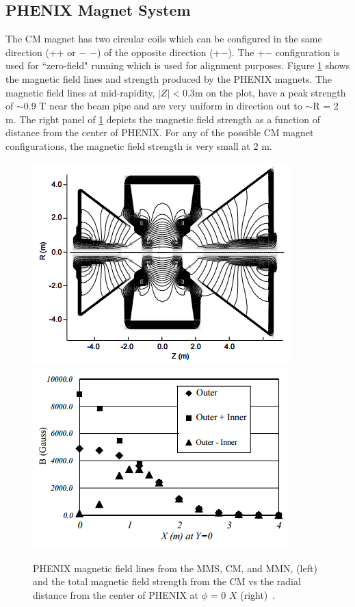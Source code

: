 \subsection{PHENIX Magnet System}
 The CM magnet has two circular coils which can be configured in the same direction (++ or $-$ $-$) of the opposite direction (+$-$). The +$-$ configuration is used for ``zero-field" running which is used for alignment purposes. Figure \ref{fig:magnet_figures} shows the magnetic field lines and strength produced by the PHENIX magnets. The magnetic field lines at mid-rapidity, $|Z| < 0.3$m on the plot, have a peak strength of $\sim$0.9 T near the beam pipe and are very uniform in direction out to $\sim$R = 2 m. The right panel of \ref{fig:magnet_figures} depicts the magnetic field strength as a function of distance from the center of PHENIX. For any of the possible CM magnet configurations, the magnetic field strength is very small at 2 m.
\begin{figure}[!ht]
\begin{center}
\includegraphics[width=0.45\linewidth]{figs/magnet_map.png}
\includegraphics[width=0.45\linewidth]{figs/magnetic_field_strength.png}
\caption{PHENIX magnetic field lines from the MMS, CM, and MMN, (left) and the total magnetic field strength from the CM vs the radial distance from the center of PHENIX at $\phi$ = 0 $X$ (right)~\cite{Aronson2003480}.}
\label{fig:magnet_figures}
\end{center}
\end{figure}
